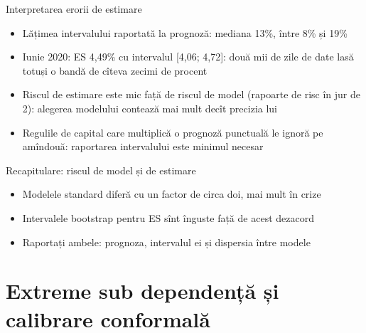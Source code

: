 \begin{frame}{Interpretarea erorii de estimare}
\itemsize{\small}
\begin{itemize}
    \item Lățimea intervalului raportată la prognoză: mediana 13\%, între 8\% și 19\%
    \item Iunie 2020: ES 4{,}49\% cu intervalul [4{,}06; 4{,}72]: două mii de zile de date lasă totuși o bandă de cîteva zecimi de procent
    \item Riscul de estimare este mic față de riscul de model (rapoarte de risc în jur de 2): alegerea modelului contează mai mult decît precizia lui
    \item Regulile de capital care multiplică o prognoză punctuală le ignoră pe amîndouă: raportarea intervalului este minimul necesar
\end{itemize}
\end{frame}

\begin{frame}{Recapitulare: riscul de model și de estimare}
\itemsize{\small}
\begin{itemize}
    \item Modelele standard diferă cu un factor de circa doi, mai mult în crize
    \item Intervalele bootstrap pentru ES sînt înguste față de acest dezacord
    \item Raportați ambele: prognoza, intervalul ei și dispersia între modele
\end{itemize}
\end{frame}


\section{Extreme sub dependență și calibrare conformală}

